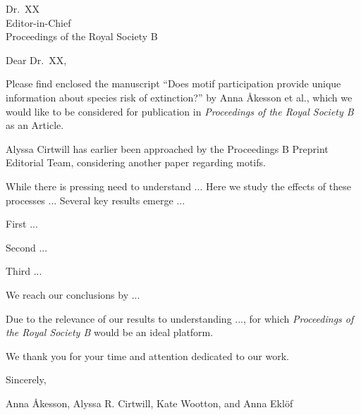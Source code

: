 \documentclass[11pt]{letter}
\date{October XX, 2021}
\begin{document}
\begin{letter}{
\vspace{-2.5cm}

Dr.~XX\\
Editor-in-Chief\\
Proceedings of the Royal Society B} %


\opening{Dear Dr.~XX,}

Please find enclosed the manuscript ``Does motif participation provide unique information about species risk of extinction?'' by Anna {\AA}kesson et al., which we would like to be considered for publication in \emph{Proceedings of the Royal Society B} as an Article.

Alyssa Cirtwill has earlier been approached by the Proceedings B Preprint Editorial Team, considering another paper regarding motifs.

While there is pressing need to understand ...
Here we study the effects of these processes ... 
Several key results emerge ...

First ...

Second ...

Third ...

We reach our conclusions by ...

Due to the relevance of our results to understanding ..., for which \emph{ Proceedings of the Royal Society B} would be an ideal platform.

We thank you for your time and attention dedicated to our work.


\vspace{2\parskip}

\hspace{4\parskip} Sincerely,

\hspace{4\parskip} Anna {\AA}kesson, Alyssa R. Cirtwill, Kate Wootton, and Anna Ekl\"of


\end{letter} 
\end{document}

